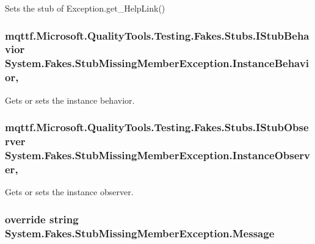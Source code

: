 Sets the stub of Exception.\-get\-\_\-\-Help\-Link()

\hypertarget{class_system_1_1_fakes_1_1_stub_missing_member_exception_ae736153fd92ba8e9ee46e2ba5650d84f}{
\subsubsection[{Instance\-Behavior}]{\setlength{\rightskip}{0pt plus 5cm}mqttf.\-Microsoft.\-Quality\-Tools.\-Testing.\-Fakes.\-Stubs.\-I\-Stub\-Behavior System.\-Fakes.\-Stub\-Missing\-Member\-Exception.\-Instance\-Behavior\hspace{0.3cm}{\ttfamily [get]}, {\ttfamily [set]}}}\label{class_system_1_1_fakes_1_1_stub_missing_member_exception_ae736153fd92ba8e9ee46e2ba5650d84f}


Gets or sets the instance behavior.

\hypertarget{class_system_1_1_fakes_1_1_stub_missing_member_exception_aa46cdb6abf16e302449eebd0e682ef80}{
\subsubsection[{Instance\-Observer}]{\setlength{\rightskip}{0pt plus 5cm}mqttf.\-Microsoft.\-Quality\-Tools.\-Testing.\-Fakes.\-Stubs.\-I\-Stub\-Observer System.\-Fakes.\-Stub\-Missing\-Member\-Exception.\-Instance\-Observer\hspace{0.3cm}{\ttfamily [get]}, {\ttfamily [set]}}}\label{class_system_1_1_fakes_1_1_stub_missing_member_exception_aa46cdb6abf16e302449eebd0e682ef80}


Gets or sets the instance observer.

\hypertarget{class_system_1_1_fakes_1_1_stub_missing_member_exception_aa5c9e6bc473f3946df6be1393a7732f9}{
\subsubsection[{Message}]{\setlength{\rightskip}{0pt plus 5cm}override string System.\-Fakes.\-Stub\-Missing\-Member\-Exception.\-Message\hspace{0.3cm}{\ttfamily [get]}}}\label{class_system_1_1_fakes_1_1_stub_missing_member_exception_aa5c9e6bc473f3946df6be1393a7732f9}


